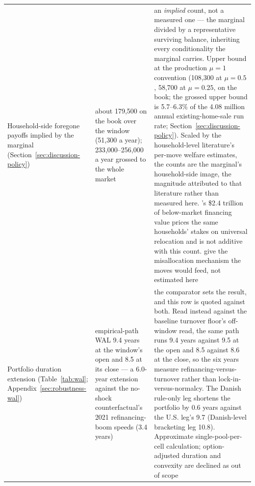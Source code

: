 \documentclass[12pt]{article}
\begin{document}
{\begin{longtable}{@{}p{4.6cm}p{4.6cm}p{5.3cm}@{}}
\addlinespace
Household-side foregone payoffs implied by the marginal (Section~\ref{sec:discussion-policy}) & about 179{,}500 on the book over the window (51{,}300 a year); 233{,}000--256{,}000 a year grossed to the whole market & an \emph{implied} count, not a measured one --- the marginal divided by a representative surviving balance, inheriting every conditionality the marginal carries. Upper bound at the production $\mu = 1$ convention (108{,}300 at $\mu = 0.5$, 58{,}700 at $\mu = 0.25$, on the book; the grossed upper bound is 5.7--6.3\% of the 4.08 million annual existing-home-sale run rate; Section~\ref{sec:discussion-policy}). Scaled by the household-level literature's per-move welfare estimates, the counts are the marginal's household-side image, the magnitude attributed to that literature \citep{gerardi2024} rather than measured here. \citet{batzer2024}'s \$2.4 trillion of below-market financing value prices the same households' stakes on universal relocation and is not additive with this count. \citet{hsieh2019} give the misallocation mechanism the moves would feed, not estimated here \\
\addlinespace
Portfolio duration extension (Table~\ref{tab:wal}; Appendix~\ref{sec:robustness-wal}) & empirical-path WAL 9.4 years at the window's open and 8.5 at its close --- a 6.0-year extension against the no-shock counterfactual's 2021 refinancing-boom speeds (3.4 years) & the comparator sets the result, and this row is quoted against both. Read instead against the baseline turnover floor's off-window read, the same path runs 9.4 years against 9.5 at the open and 8.5 against 8.6 at the close, so the six years measure refinancing-versus-turnover rather than lock-in-versus-normalcy. The Danish rule-only leg shortens the portfolio by 0.6 years against the U.S. leg's 9.7 (Danish-level bracketing leg 10.8). Approximate single-pool-per-cell calculation; option-adjusted duration and convexity are declined as out of scope \\
\bottomrule
\end{longtable}
}

\end{document}
